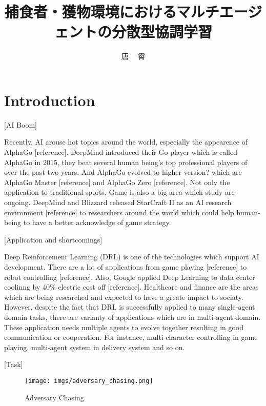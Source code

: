 \documentclass[11pt,twocolumn]{jarticle} %
\title{捕食者・獲物環境におけるマルチエージェントの分散型協調学習}
\author{唐 \ \ 霄}
\begin{document}
\maketitle
\thispagestyle{iitheader}
\section{Introduction}
[AI Boom] \par
Recently, AI arouse hot topics around the world, especially the appearence of AlphaGo [reference]. DeepMind introduced their Go player which is called AlphaGo in 2015, they beat several human being's top professional players of over the past two years. And AlphaGo evolved to higher version? which are AlphaGo Master [reference] and AlphaGo Zero [reference]. Not only the application to traditional sports, Game is also a big area which study are ongoing. DeepMind and Blizzard released StarCraft II as an AI research environment [reference] to researchers around the world which could help human-being to have a better acknowledge of game strategy.\par

[Application and shortcomings] \par
Deep Reinforcement Learning (DRL) is one of the technologies which support AI development. There are a lot of applications from game playing [reference] to robot controlling [reference]. Also, Google applied Deep Learning to data center coolinng by 40\% electric cost off [reference]. Healthcare and finance are the areas which are being researched and expected to have a greate impact to sociaty. However, despite the fact that DRL is successfully applied to many single-agent domain tasks, there are varianty of applications which are in multi-agent domain. These application needs multiple agents to evolve together resulting in good communication or cooperation. For instance, multi-character controlling in game playing, multi-agent system in delivery system and so on.

[Task]
\begin{figure}[t]
 \begin{center}
  \texttt{[image: imgs/adversary\_chasing.png]}
  \caption{Adversary Chasing}\label{fig:adversaryChasing}
 \end{center}
\end{figure}
\end{document}
